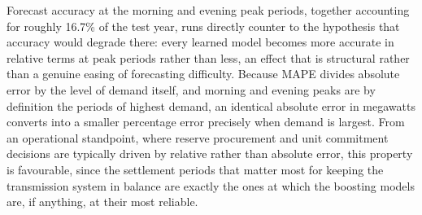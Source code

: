 \documentclass[runningheads]{llncs}
\begin{document}
Forecast accuracy at the morning and evening peak periods, together accounting for roughly 16.7\% of the test year, runs directly counter to the hypothesis that accuracy would degrade there: every learned model becomes more accurate in relative terms at peak periods rather than less, an effect that is structural rather than a genuine easing of forecasting difficulty. Because MAPE divides absolute error by the level of demand itself, and morning and evening peaks are by definition the periods of highest demand, an identical absolute error in megawatts converts into a smaller percentage error precisely when demand is largest. From an operational standpoint, where reserve procurement and unit commitment decisions are typically driven by relative rather than absolute error, this property is favourable, since the settlement periods that matter most for keeping the transmission system in balance are exactly the ones at which the boosting models are, if anything, at their most reliable.
\end{document}
